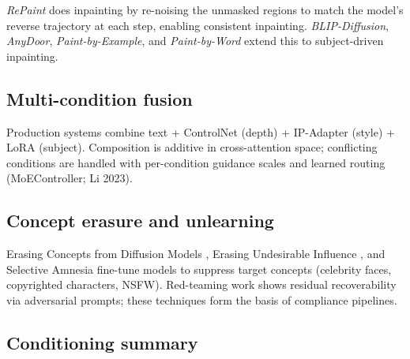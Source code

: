 \documentclass{article}
\begin{document}
\emph{RePaint} \citep{lugmayr2022repaintinpaintingu} does inpainting by re-noising the unmasked regions to match the model's reverse trajectory at each step, enabling consistent inpainting. \emph{BLIP-Diffusion}, \emph{AnyDoor}, \emph{Paint-by-Example}, and \emph{Paint-by-Word} extend this to subject-driven inpainting.

\subsection{Multi-condition fusion}\label{multi-condition-fusion}

Production systems combine text + ControlNet (depth) + IP-Adapter (style) + LoRA (subject). Composition is additive in cross-attention space; conflicting conditions are handled with per-condition guidance scales and learned routing (MoEController; Li 2023).

\subsection{Concept erasure and unlearning}\label{concept-erasure-and-unlearning}

Erasing Concepts from Diffusion Models \citep{gandikota2023erasingconceptsfro}, Erasing Undesirable Influence \citep{wu20242024}, and Selective Amnesia fine-tune models to suppress target concepts (celebrity faces, copyrighted characters, NSFW). Red-teaming work shows residual recoverability via adversarial prompts; these techniques form the basis of compliance pipelines.

\subsection{Conditioning summary}\label{conditioning-summary}
\end{document}
